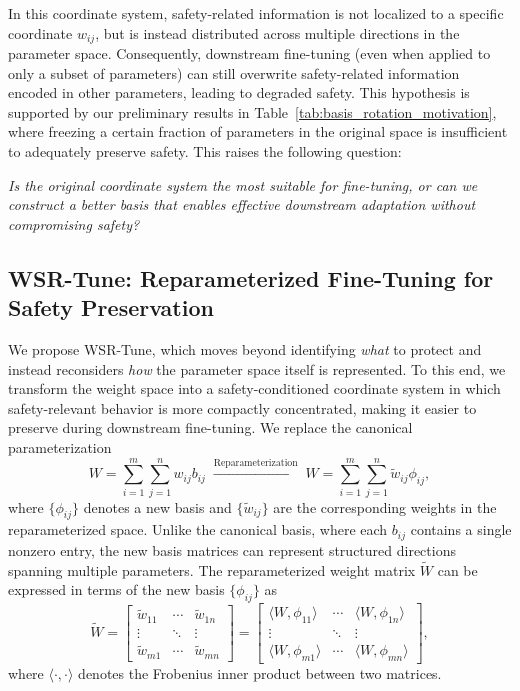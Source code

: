 \documentclass{article}
\begin{document}
In this coordinate system, safety-related information is not localized to a specific coordinate $w_{ij}$, but is instead distributed across multiple directions in the parameter space. Consequently, downstream fine-tuning (even when applied to only a subset of parameters) can still overwrite safety-related information encoded in other parameters, leading to degraded safety. This hypothesis is supported by our preliminary results in Table~\ref{tab:basis_rotation_motivation}, where  freezing a certain fraction of parameters in the original space is insufficient to adequately preserve safety. This raises the following question:

\textit{Is the original coordinate system the most suitable for fine-tuning, or can we construct a better basis that enables effective downstream  adaptation without compromising safety?}




\vspace{-1mm}
\subsection{WSR-Tune: Reparameterized Fine-Tuning for Safety Preservation}
\label{sec:wsr-algorithm}
\vspace{-1mm}
We propose WSR-Tune, which moves beyond identifying \textit{what} to protect and instead reconsiders \textit{how} the parameter space itself is represented.  To this end, we transform the weight space into a safety-conditioned coordinate system in which safety-relevant behavior is more compactly concentrated, making it easier to preserve during downstream fine-tuning. We replace the canonical parameterization 
\begin{equation}
W = \sum_{i=1}^m\sum_{j=1}^nw_{ij}b_{ij}
\;\xrightarrow{\text{Reparameterization}}\;
W = \sum_{i=1}^m\sum_{j=1}^n \tilde{w}_{ij} \phi_{ij}, 
\end{equation}
where $\{\phi_{ij}\}$ denotes a new basis and $\{\tilde{w}_{ij}\}$ are the corresponding weights in the reparameterized space. Unlike the canonical basis, where each $b_{ij}$ contains a single nonzero entry, the new basis matrices can represent structured directions spanning multiple parameters. The reparameterized weight matrix $\tilde{W}$ can be expressed in terms of the new basis $\{\phi_{ij}\}$ as
\begin{equation}
\tilde{W} =
\begin{bmatrix}
\tilde{w}_{11} & \cdots & \tilde{w}_{1n} \\
\vdots & \ddots & \vdots \\
\tilde{w}_{m1} & \cdots & \tilde{w}_{mn}
\end{bmatrix}
=
\begin{bmatrix}
\langle W, \phi_{11} \rangle & \cdots & \langle W, \phi_{1n} \rangle \\
\vdots & \ddots & \vdots \\
\langle W, \phi_{m1} \rangle & \cdots & \langle W, \phi_{mn} \rangle
\end{bmatrix},
\end{equation}
where $\langle \cdot, \cdot \rangle$ denotes the Frobenius inner product between two matrices. 
\end{document}
